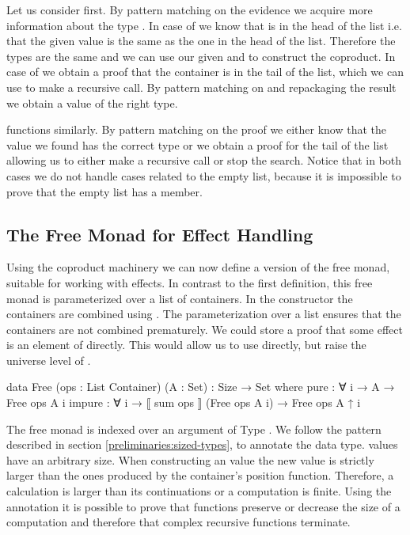 Let us consider  first.
By pattern matching on the evidence we acquire more information about the type
\AgdaSpace{}.
In case of  we know that  is in
the head of the list i.e. that the given value 
is the same as the one in the head of the list.
Therefore the  types are the same and we can use our given
 and  to construct the coproduct.
In case of  we obtain a proof that the container
is in the tail of the list, which we can use to make a recursive call.
By pattern matching on and repackaging the result we obtain a value of the right
type.

 functions similarly.
By pattern matching on the proof we either know that the value we found has
the correct type or we obtain a proof for the tail of the list allowing us to
either make a recursive call or stop the search.
Notice that in both cases we do not handle cases related to the empty list,
because it is impossible to prove that the empty list has a member.


\subsection{The Free Monad for Effect Handling}
\label{first-order:free-monad}

Using the coproduct machinery we can now define a version of the free monad,
suitable for working with effects.
In contrast to the first definition, this free monad is parameterized over a
list of containers.
In the  constructor the containers are combined
using .
The parameterization over a list ensures that the containers are not combined
prematurely.
We could store a proof that some effect  is an element of
 directly.
This would allow us to use  directly, but raise the universe
level of .

\begin{code}
data Free (ops : List Container) (A : Set) : {Size} → Set where
  pure    : ∀ {i} → A → Free ops A {i}
  impure  : ∀ {i} → ⟦ sum ops ⟧ (Free ops A {i}) → Free ops A {↑ i}
\end{code}
The free monad is indexed over an argument of Type .
We follow the pattern described in section \ref{preliminaries:sized-types}, to
annotate the data type.
 values have an arbitrary size.
When constructing an  value the new value is
strictly larger than the ones produced by the container's position function.
Therefore, a calculation is larger than its continuations or a computation is
finite.
Using the annotation it is possible to prove that functions preserve or decrease
the size of a computation and therefore that complex recursive functions
terminate.


